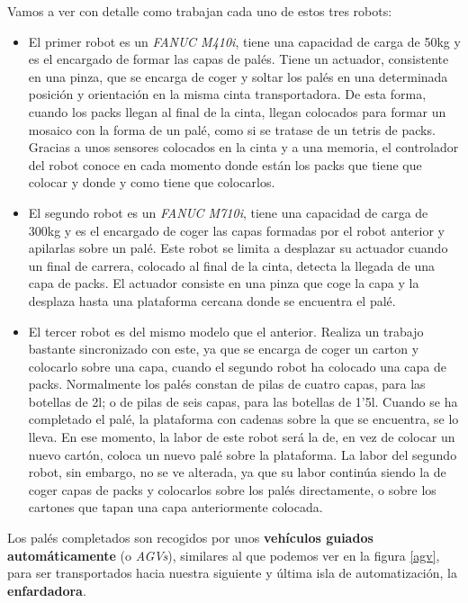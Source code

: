 \documentclass[11pt,a4paper,spanish,twoside]{report}
\begin{document}
Vamos a ver con detalle como trabajan cada uno de estos tres robots:
\begin{itemize}
\item El primer robot es un \emph{FANUC M410i}, tiene una capacidad de carga de 50kg
y es el encargado de formar las capas de palés. Tiene un actuador, consistente
en una pinza, que se encarga de coger y soltar los palés en una determinada 
posición y orientación en la misma cinta transportadora. De esta forma, cuando 
los packs llegan al final de la cinta, llegan colocados para formar un mosaico 
con la forma de un palé, como si se tratase de un tetris de packs. Gracias a 
unos sensores colocados en la cinta y a una memoria, el controlador del robot 
conoce en cada momento donde están los packs que tiene que colocar y donde y 
como tiene que colocarlos.
\item El segundo robot es un \emph{FANUC M710i}, tiene una capacidad de carga de 
300kg y es el encargado de coger las capas formadas por el robot anterior y
apilarlas sobre un palé. Este robot se limita a desplazar su actuador cuando
un final de carrera, colocado al final de la cinta, detecta la llegada de una
capa de packs. El actuador consiste en una pinza que coge la capa y la
desplaza hasta una plataforma cercana donde se encuentra el palé.

\item El tercer robot es del mismo modelo que el anterior. Realiza un trabajo
bastante sincronizado con este, ya que se encarga de coger un carton y
colocarlo sobre una capa, cuando el segundo robot ha colocado una capa de
packs. Normalmente los palés constan de pilas de cuatro capas, para las
botellas de 2l; o de pilas de seis capas, para las botellas de 1'5l. Cuando
se ha completado el palé, la plataforma con cadenas sobre la que se
encuentra, se  lo lleva. En ese momento, la labor de este robot será la de,
en vez de colocar un nuevo cartón, coloca un nuevo palé sobre la
plataforma. La labor del segundo robot, sin embargo, no se ve alterada, ya
que su labor continúa siendo la de coger capas de packs y colocarlos sobre
los palés directamente, o sobre los cartones que tapan una capa anteriormente
colocada. 
\end{itemize}

Los palés completados son recogidos por unos \textbf{vehículos guiados 
automáticamente} (o \emph{AGVs}), similares al que podemos ver en la figura
\ref{agv}, para ser transportados hacia nuestra siguiente
y última isla de automatización, la \textbf{enfardadora}.
\end{document}
